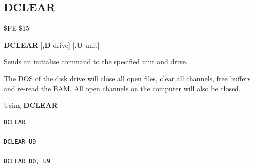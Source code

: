 
\newpage
\subsection{DCLEAR}
\begin{description}[leftmargin=2cm,style=nextline]
\item [Token:]    \$FE \$15

\item [Format:]   {\bf DCLEAR} [{\bf,D} drive] [{\bf,U} unit]

\item [Usage:]    Sends an initialise command to the specified unit and drive.

                  \drivedefinition

                  \unitdefinition

                  The DOS of the disk drive will close all open files, clear all channels, free buffers and re-read the BAM. All open channels on the computer will also be closed.

\item [Examples:] Using {\bf DCLEAR}

\begin{tcolorbox}[colback=black,coltext=white]
\verbatimfont{\codefont}
\begin{verbatim}
DCLEAR

DCLEAR U9

DCLEAR D0, U9
\end{verbatim}
\end{tcolorbox}
\end{description}


\newpage
